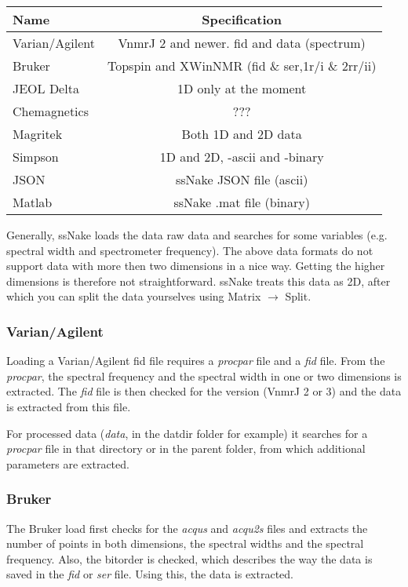 \documentclass[11pt,a4paper]{article}
\begin{document}
\begin{center}
\begin{tabular}{lc}
\toprule
Name & Specification \\
\midrule
\rowcolor{gray!30!white}
Varian/Agilent & VnmrJ 2 and newer. fid and data (spectrum)\\
Bruker & Topspin and XWinNMR (fid \& ser,1r/i \& 2rr/ii) \\
\rowcolor{gray!30!white}
JEOL Delta & 1D only at the moment \\
Chemagnetics & ??? \\
\rowcolor{gray!30!white}
Magritek & Both 1D and 2D data \\
Simpson & 1D and 2D, -ascii and -binary \\
\rowcolor{gray!30!white}
JSON & ssNake JSON file (ascii)\\
Matlab & ssNake .mat file (binary)\\
\bottomrule
\end{tabular}
\end{center}

Generally, ssNake loads the data raw data and searches for some variables (e.g. spectral width and spectrometer frequency). The above data formats do not support data with more then two dimensions in a nice way. Getting the higher dimensions is therefore not straightforward. ssNake treats this data as 2D, after which you can split the data yourselves using Matrix $\rightarrow$ Split.

\subsubsection*{Varian/Agilent}
Loading a Varian/Agilent fid file requires a \textit{procpar} file and a \textit{fid} file. From the \textit{procpar}, the spectral frequency and the spectral width in one or two dimensions is extracted. The \textit{fid} file is then checked for the version (VnmrJ 2 or 3) and the data is extracted from this file.

For processed data (\textit{data}, in the datdir folder for example) it searches for a \textit{procpar} file in that directory or in the parent folder, from which additional parameters are extracted.

\subsubsection*{Bruker}
The Bruker load first checks for the \textit{acqus} and \textit{acqu2s} files and extracts the number of points in both dimensions, the spectral widths and the spectral frequency. Also, the bitorder is checked, which describes the way the data is saved in the \textit{fid} or \textit{ser} file. Using this, the data is extracted.
\end{document}
